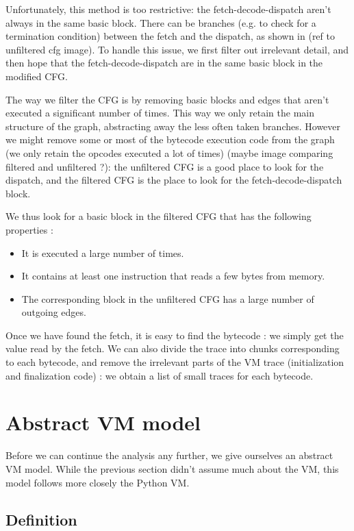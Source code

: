 \documentclass[french]{article}
\begin{document}
Unfortunately, this method is too restrictive: the fetch-decode-dispatch aren't always in the same basic block. There can be branches (e.g. to check for a termination condition) between the fetch and the dispatch, as shown in (ref to unfiltered cfg image). To handle this issue, we first filter out irrelevant detail, and then hope that the fetch-decode-dispatch are in the same basic block in the modified CFG. 

The way we filter the CFG is by removing basic blocks and edges that aren't executed a significant number of times. This way we only retain the main structure of the graph, abstracting away the less often taken branches. However we might remove some or most of the bytecode execution code from the graph (we only retain the opcodes executed a lot of times) (maybe image comparing filtered and unfiltered ?): the unfiltered CFG is a good place to look for the dispatch, and the filtered CFG is the place to look for the fetch-decode-dispatch block. 

We thus look for a basic block in the filtered CFG that has the following properties :
\begin{itemize}
	\item It is executed a large number of times.
	\item It contains at least one instruction that reads a few bytes from memory.
	\item The corresponding block in the unfiltered CFG has a large number of outgoing edges.
\end{itemize}

Once we have found the fetch, it is easy to find the bytecode : we simply get the value read by the fetch. We can also divide the trace into chunks corresponding to each bytecode, and remove the irrelevant parts of the VM trace (initialization and finalization code) : we obtain a list of small traces for each bytecode.


\section{Abstract VM model}

Before we can continue the analysis any further, we give ourselves an abstract VM model. While the previous section didn't assume much about the VM, this model follows more closely the Python VM.
\subsection{Definition}
\end{document}
